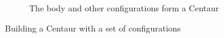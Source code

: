 \documentclass[graybox]{svmult}
\begin{document}
\begin{figure}
\begin{center}
\begin{subfigure}[b]{0.65\columnwidth}
                \caption{The body and other configurations form a Centaur}
                \label{fig:walkbot2}
        \end{subfigure}
\end{center}
\caption{Building a Centaur with a set of configurations}
\label{fig:walkbot}
\end{figure}

\end{document}
